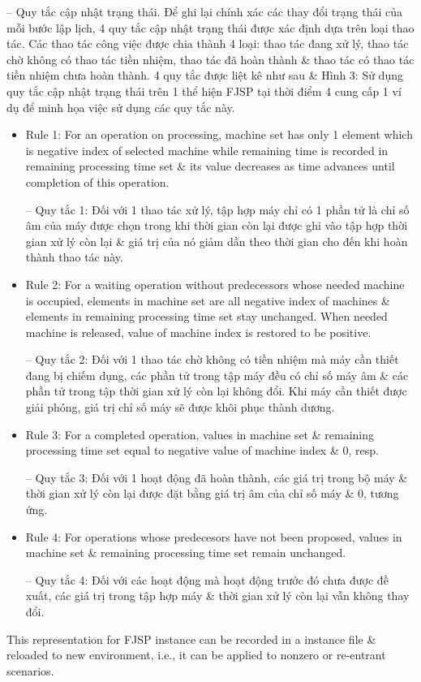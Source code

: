 \documentclass{article}
\begin{document}
\begin{itemize}
\begin{itemize}
        -- {\sf Quy tắc cập nhật trạng thái.} Để ghi lại chính xác các thay đổi trạng thái của mỗi bước lập lịch, 4 quy tắc cập nhật trạng thái được xác định dựa trên loại thao tác. Các thao tác công việc được chia thành 4 loại: thao tác đang xử lý, thao tác chờ không có thao tác tiền nhiệm, thao tác đã hoàn thành \& thao tác có thao tác tiền nhiệm chưa hoàn thành. 4 quy tắc được liệt kê như sau \& {\sf Hình 3: Sử dụng quy tắc cập nhật trạng thái trên 1 thể hiện FJSP tại thời điểm 4} cung cấp 1 ví dụ để minh họa việc sử dụng các quy tắc này.
        \begin{itemize}
            \item Rule 1: For an operation on processing, machine set has only 1 element which is negative index of selected machine while remaining time is recorded in remaining processing time set \& its value decreases as time advances until completion of this operation.

            -- Quy tắc 1: Đối với 1 thao tác xử lý, tập hợp máy chỉ có 1 phần tử là chỉ số âm của máy được chọn trong khi thời gian còn lại được ghi vào tập hợp thời gian xử lý còn lại \& giá trị của nó giảm dần theo thời gian cho đến khi hoàn thành thao tác này.
            \item Rule 2: For a waiting operation without predecessors whose needed machine is occupied, elements in machine set are all negative index of machines \& elements in remaining processing time set stay unchanged. When needed machine is released, value of machine index is restored to be positive.

            -- Quy tắc 2: Đối với 1 thao tác chờ không có tiền nhiệm mà máy cần thiết đang bị chiếm dụng, các phần tử trong tập máy đều có chỉ số máy âm \& các phần tử trong tập thời gian xử lý còn lại không đổi. Khi máy cần thiết được giải phóng, giá trị chỉ số máy sẽ được khôi phục thành dương.
            \item Rule 3: For a completed operation, values in machine set \& remaining processing time set equal to negative value of machine index \& 0, resp.

            -- Quy tắc 3: Đối với 1 hoạt động đã hoàn thành, các giá trị trong bộ máy \& thời gian xử lý còn lại được đặt bằng giá trị âm của chỉ số máy \& 0, tương ứng.
            \item Rule 4: For operations whose predecesors have not been proposed, values in machine set \& remaining processing time set remain unchanged.

            -- Quy tắc 4: Đối với các hoạt động mà hoạt động trước đó chưa được đề xuất, các giá trị trong tập hợp máy \& thời gian xử lý còn lại vẫn không thay đổi.
        \end{itemize}
        This representation for FJSP instance can be recorded in a instance file \& reloaded to new environment, i.e., it can be applied to nonzero or re-entrant scenarios.


\end{itemize}
\end{itemize}
\end{document}
